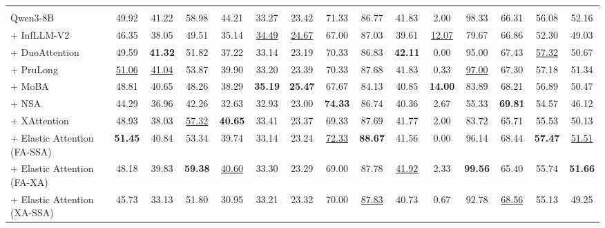 \begin{table}[t]
{\begin{tabular}{l|ccccccccccccc|c}
\arrayrulecolor{black}\midrule
\rowcolor{blue!25}
\multicolumn{15}{c}{\textbf{Qwen3-8B 骨干模型}} \\
\arrayrulecolor{black!20}\midrule
Qwen3-8B & 49.92 & 41.22 & 58.98 & 44.21 & 33.27 & 23.42 & 71.33 & 86.77 & 41.83 & 2.00 & 98.33 & 66.31 & 56.08 & 52.16 \\
+ InfLLM-V2 & 46.35 & 38.05 & 49.51 & 35.14 & \underline{34.49} & \underline{24.67} & 67.00 & 87.03 & 39.61 & \underline{12.07} & 79.67 & 66.86 & 52.30 & 49.03 \\
+ DuoAttention & 49.59 & \textbf{41.32} & 51.82 & 37.22 & 33.14 & 23.19 & 70.33 & 86.83 & \textbf{42.11} & 0.00 & 95.00 & 67.43 & \underline{57.32} & 50.67 \\
+ PruLong & \underline{51.06} & \underline{41.04} & 53.87 & 39.90 & 33.20 & 23.39 & 70.33 & 87.68 & 41.83 & 0.33 & \underline{97.00} & 67.30 & 57.18 & 51.34 \\
+ MoBA & 48.81 & 40.65 & 48.26 & 38.29 & \textbf{35.19} & \textbf{25.47} & 67.67 & 84.13 & 40.85 & \textbf{14.00} & 83.89 & 68.21 & 56.89 & 50.47 \\
+ NSA & 44.29 & 36.96 & 42.26 & 32.63 & 32.93 & 23.00 & \textbf{74.33} & 86.74 & 40.36 & 2.67 & 55.33 & \textbf{69.81} & 54.57 & 46.12 \\
+ XAttention & 48.93 & 38.03 & \underline{57.32} & \textbf{40.65} & 33.41 & 23.37 & 69.33 & 87.69 & 41.77 & 2.00 & 83.72 & 65.71 & 55.53 & 50.13 \\
\arrayrulecolor{black!40}\midrule
+ Elastic Attention (FA-SSA) & \textbf{51.45} & 40.84 & 53.34 & 39.74 & 33.14 & 23.24 & \underline{72.33} & \textbf{88.67} & 41.56 & 0.00 & 96.14 & 68.44 & \textbf{57.47} & \underline{51.51} \\
+ Elastic Attention (FA-XA) & 48.18 & 39.83 & \textbf{59.38} & \underline{40.60} & 33.30 & 23.29 & 69.00 & 87.78 & \underline{41.92} & 2.33 & \textbf{99.56} & 65.40 & 55.74 & \textbf{51.66} \\
+ Elastic Attention (XA-SSA) & 45.73 & 33.13 & 51.80 & 30.95 & 33.21 & 23.32 & 70.00 & \underline{87.83} & 40.73 & 0.67 & 92.78 & \underline{68.56} & 55.13 & 49.25 \\


\end{tabular}}
\end{table}

